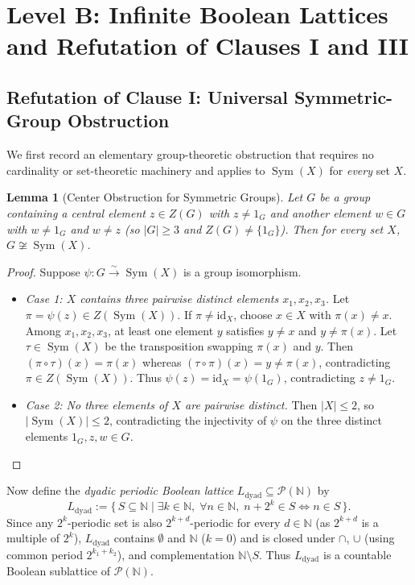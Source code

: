 \documentclass[11pt]{article}
\newtheorem{lemma}[theorem]{Lemma}
\theoremstyle{definition}
\theoremstyle{remark}
\newcommand{\Sym}{\operatorname{Sym}}
\newcommand{\id}{\mathrm{id}}
\newcommand{\N}{\mathbb{N}}
\newcommand{\Ldyad}{L_{\mathrm{dyad}}}
\begin{document}
\section{Level B: Infinite Boolean Lattices and Refutation of Clauses I and III}

\subsection{Refutation of Clause I: Universal Symmetric-Group Obstruction}

We first record an elementary group-theoretic obstruction that requires no cardinality or set-theoretic machinery and applies to $\Sym(X)$ for \emph{every} set $X$.

\begin{lemma}[Center Obstruction for Symmetric Groups]
\label{lem:sym-center}
Let $G$ be a group containing a central element $z \in Z(G)$ with $z \neq 1_G$ and another element $w \in G$ with $w \neq 1_G$ and $w \neq z$ (so $|G| \ge 3$ and $Z(G) \neq \{1_G\}$). Then for \emph{every} set $X$, $G \not\cong \Sym(X)$.
\end{lemma}
\begin{proof}
Suppose $\psi : G \xrightarrow{\sim} \Sym(X)$ is a group isomorphism.
\begin{itemize}
  \item \emph{Case 1: $X$ contains three pairwise distinct elements $x_1, x_2, x_3$.} Let $\pi = \psi(z) \in Z(\Sym(X))$. If $\pi \neq \id_X$, choose $x \in X$ with $\pi(x) \neq x$. Among $x_1, x_2, x_3$, at least one element $y$ satisfies $y \neq x$ and $y \neq \pi(x)$. Let $\tau \in \Sym(X)$ be the transposition swapping $\pi(x)$ and $y$. Then $(\pi \circ \tau)(x) = \pi(x)$ whereas $(\tau \circ \pi)(x) = y \neq \pi(x)$, contradicting $\pi \in Z(\Sym(X))$. Thus $\psi(z) = \id_X = \psi(1_G)$, contradicting $z \neq 1_G$.
  \item \emph{Case 2: No three elements of $X$ are pairwise distinct.} Then $|X| \le 2$, so $|\Sym(X)| \le 2$, contradicting the injectivity of $\psi$ on the three distinct elements $1_G, z, w \in G$. \qedhere
\end{itemize}
\end{proof}

Now define the \emph{dyadic periodic Boolean lattice} $\Ldyad \subseteq \mathcal{P}(\N)$ by
\[
  \Ldyad := \bigl\{\, S \subseteq \N \;\big|\; \exists k \in \N,\; \forall n \in \N,\; n + 2^k \in S \iff n \in S \,\bigr\}.
\]
Since any $2^k$-periodic set is also $2^{k+d}$-periodic for every $d \in \N$ (as $2^{k+d}$ is a multiple of $2^k$), $\Ldyad$ contains $\emptyset$ and $\N$ ($k = 0$) and is closed under $\cap$, $\cup$ (using common period $2^{k_1 + k_2}$), and complementation $\N \setminus S$. Thus $\Ldyad$ is a countable Boolean sublattice of $\mathcal{P}(\N)$.
\end{document}
